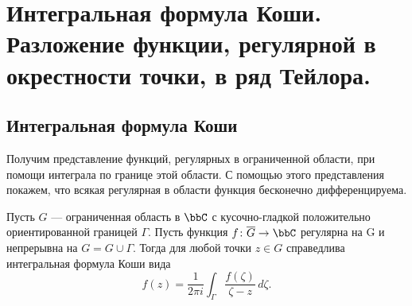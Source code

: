 \chapter{Интегральная формула Коши. Разложение функции, регулярной в окрестности точки, в ряд Тейлора.}
\section{Интегральная формула Коши}

Получим представление функций, регулярных в ограниченной области, при помощи интеграла по границе этой области. С помощью этого представления покажем, что всякая регулярная в области функция бесконечно дифференцируема.
\begin{thm} \label{T1}
 Пусть $G$ — ограниченная область в $\bbC$ с кусочно-гладкой положительно ориентированной границей $\Gamma$. Пусть функция $f\colon \overline{G}\to \bbC$ регулярна на G и непрерывна на $G=G\cup\Gamma$. Тогда для любой точки $z\in G$ справедлива интегральная формула Коши вида
 \begin{equation} \label{1}
 f(z) = \frac{1}{2\pi i}\int_\Gamma \frac{f(\zeta)}{\zeta - z}\,d\zeta.
 \end{equation}
\end{thm}

